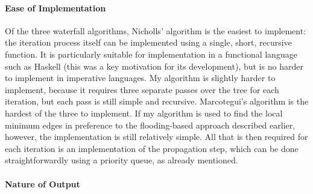 \paragraph{Ease of Implementation}

Of the three waterfall algorithms, Nicholls' algorithm is the easiest to implement: the iteration process itself can be implemented using a single, short, recursive function. It is particularly suitable for implementation in a functional language such as Haskell (this was a key motivation for its development), but is no harder to implement in imperative languages. My algorithm is slightly harder to implement, because it requires three separate passes over the tree for each iteration, but each pass is still simple and recursive. Marcotegui's algorithm is the hardest of the three to implement. If my algorithm is used to find the local minimum edges in preference to the flooding-based approach described earlier, however, the implementation is still relatively simple. All that is then required for each iteration is an implementation of the propagation step, which can be done straightforwardly using a priority queue, as already mentioned.

\paragraph{Nature of Output}

